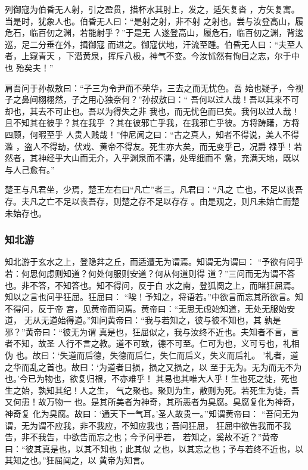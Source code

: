 \documentclass[]{article}
\begin{document}
列御寇为伯昏无人射，引之盈贯，措杯水其肘上，发之，适矢复沓
，方矢复寓。当是时，犹象人也。伯昏无人曰：``是射之射，非不射
之射也。尝与汝登高山，履危石，临百仞之渊，若能射乎？''于是无
人遂登高山，履危石，临百仞之渊，背逡巡，足二分垂在外，揖御寇
而进之。御寇伏地，汗流至踵。伯昏无人曰：``夫至人者，上窥青天
，下潜黄泉，挥斥八极，神气不变。今汝怵然有恂目之志，尔于中也 殆矣夫！''

肩吾问于孙叔敖曰：``子三为令尹而不荣华，三去之而无忧色。吾
始也疑子，今视子之鼻间栩栩然，子之用心独奈何？''孙叔敖曰：``
吾何以过人哉！吾以其来不可却也，其去不可止也。吾以为得失之非
我也，而无忧色而已矣。我何以过人哉！且不知其在彼乎？其在我乎
？其在彼邪亡乎我，在我邪亡乎彼。方将踌躇，方将四顾，何暇至乎
人贵人贱哉！''仲尼闻之曰：``古之真人，知者不得说，美人不得滥
，盗人不得劫，伏戏、黄帝不得友。死生亦大矣，而无变乎己，况爵
禄乎！若然者，其神经乎大山而无介，入乎渊泉而不濡，处卑细而不
惫，充满天地，既以与人己愈有。''

楚王与凡君坐，少焉，楚王左右曰``凡亡''者三。凡君曰：``凡之
亡也，不足以丧吾存。夫凡之亡不足以丧吾存，则楚之存不足以存存
。由是观之，则凡未始亡而楚未始存也。

\hypertarget{header-n860}{%
\subsubsection{知北游}\label{header-n860}}

知北游于玄水之上，登隐弅之丘，而适遭无为谓焉。知谓无为谓曰：
``予欲有问乎若：何思何虑则知道？何处何服则安道？何从何道则得
道？''三问而无为谓不答也。非不答，不知答也。知不得问，反于白
水之南，登狐阕之上，而睹狂屈焉。知以之言也问乎狂屈。狂屈曰：
``唉！予知之，将语若。''中欲言而忘其所欲言。知不得问，反于帝
宫，见黄帝而问焉。黄帝曰：``无思无虑始知道，无处无服始安道，
无从无道始得道。''知问黄帝曰：``我与若知之，彼与彼不知也，其
孰是邪？''黄帝曰：``彼无为谓
真是也，狂屈似之，我与汝终不近也。夫知者不言，言者不知，故圣
人行不言之教。道不可致，德不可至。仁可为也，义可亏也，礼相伪
也。故曰：`失道而后德，失德而后仁，失仁而后义，失义而后礼。
'礼者，道之华而乱之首也。故曰：`为道者日损，损之又损之，以
至于无为。无为而无不为也。'今已为物也，欲复归根，不亦难乎！
其易也其唯大人乎！生也死之徒，死也生之始，孰知其纪！人之生，
气之聚也。聚则为生，散则为死。若死生为徒，吾又何患！故万物一
也。是其所美者为神奇，其所恶者为臭腐。臭腐复化为神奇，神奇复
化为臭腐。故曰：`通天下一气耳。'圣人故贵一。''知谓黄帝曰：
``吾问无为谓，无为谓不应我，非不我应，不知应我也；吾问狂屈，
狂屈中欲告我而不我告，非不我告，中欲告而忘之也；今予问乎若，
若知之，奚故不近？''黄帝曰：``彼其真是也，以其不知也；此其似
之也，以其忘之也；予与若终不近也，以其知之也。''狂屈闻之，以
黄帝为知言。
\end{document}
